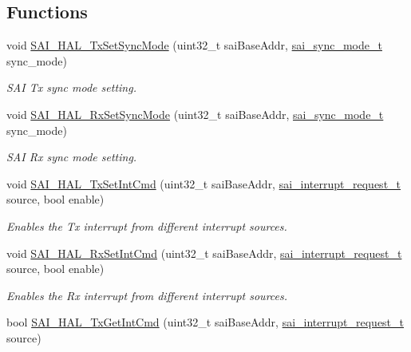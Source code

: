 \subsection*{Functions}
\begin{DoxyCompactItemize}
\item 
void \hyperlink{group__sai__hal_ga5c6b3b024d75d8723fdbdc29729e17dc}{S\+A\+I\+\_\+\+H\+A\+L\+\_\+\+Tx\+Set\+Sync\+Mode} (uint32\+\_\+t sai\+Base\+Addr, \hyperlink{group__sai__hal_ga0cc249bf49da9d53829d1e1eabc8cc91}{sai\+\_\+sync\+\_\+mode\+\_\+t} sync\+\_\+mode)
\begin{DoxyCompactList}\small\item\em S\+AI Tx sync mode setting. \end{DoxyCompactList}\item 
void \hyperlink{group__sai__hal_gafafb8a0ed8be42aa4904f0569436130b}{S\+A\+I\+\_\+\+H\+A\+L\+\_\+\+Rx\+Set\+Sync\+Mode} (uint32\+\_\+t sai\+Base\+Addr, \hyperlink{group__sai__hal_ga0cc249bf49da9d53829d1e1eabc8cc91}{sai\+\_\+sync\+\_\+mode\+\_\+t} sync\+\_\+mode)
\begin{DoxyCompactList}\small\item\em S\+AI Rx sync mode setting. \end{DoxyCompactList}\item 
void \hyperlink{group__sai__hal_ga5912d548427eb30dafe6b68cc2dc4853}{S\+A\+I\+\_\+\+H\+A\+L\+\_\+\+Tx\+Set\+Int\+Cmd} (uint32\+\_\+t sai\+Base\+Addr, \hyperlink{group__sai__hal_ga9bdde8d5136f0ba14347482d291dcb4e}{sai\+\_\+interrupt\+\_\+request\+\_\+t} source, bool enable)
\begin{DoxyCompactList}\small\item\em Enables the Tx interrupt from different interrupt sources. \end{DoxyCompactList}\item 
void \hyperlink{group__sai__hal_gaccf6a6ca1e063b94182d021e35a18795}{S\+A\+I\+\_\+\+H\+A\+L\+\_\+\+Rx\+Set\+Int\+Cmd} (uint32\+\_\+t sai\+Base\+Addr, \hyperlink{group__sai__hal_ga9bdde8d5136f0ba14347482d291dcb4e}{sai\+\_\+interrupt\+\_\+request\+\_\+t} source, bool enable)
\begin{DoxyCompactList}\small\item\em Enables the Rx interrupt from different interrupt sources. \end{DoxyCompactList}\item 
bool \hyperlink{group__sai__hal_ga8b7046a1e1a47fb3f4658b9aa05ce79c}{S\+A\+I\+\_\+\+H\+A\+L\+\_\+\+Tx\+Get\+Int\+Cmd} (uint32\+\_\+t sai\+Base\+Addr, \hyperlink{group__sai__hal_ga9bdde8d5136f0ba14347482d291dcb4e}{sai\+\_\+interrupt\+\_\+request\+\_\+t} source)

\end{DoxyCompactItemize}
